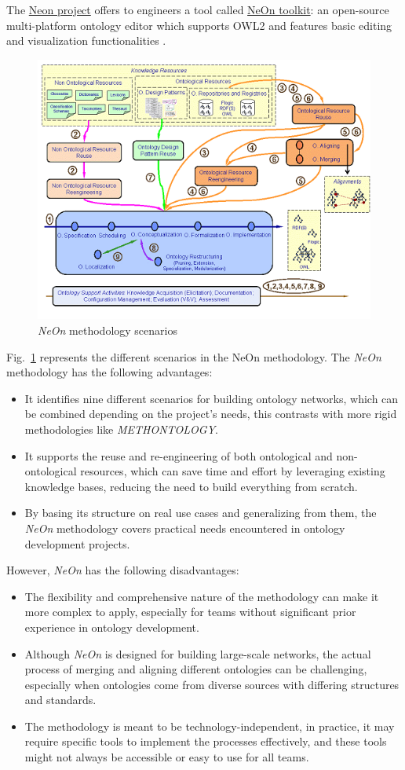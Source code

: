 The \href{http://neon-project.org/nw/Welcome_to_the_NeOn_Project.html}{Neon project} offers to engineers a tool called \href{http://neon-toolkit.org/wiki/Main_Page.html}{NeOn toolkit}: an open-source multi-platform ontology editor which supports OWL2 and features basic editing and visualization functionalities \cite{erdmann2011overview}.

\begin{figure}[H]
    \centering
    \includegraphics[width=0.5\linewidth]{Figures/fig_2.png}
    \caption{\textit{NeOn} methodology scenarios}
    \label{fig:2}
\end{figure}
Fig.~\ref{fig:2} represents the different scenarios in the NeOn methodology.
The \textit{NeOn} methodology has the following advantages:
\begin{itemize}
    \item It identifies nine different scenarios for building ontology networks, which can be combined depending on the project’s needs, this contrasts with more rigid methodologies like \textit{METHONTOLOGY}.

    \item It supports the reuse and re-engineering of both ontological and non-ontological resources, which can save time and effort by leveraging existing knowledge bases, reducing the need to build everything from scratch.

    \item By basing its structure on real use cases and generalizing from them, the \textit{NeOn} methodology covers practical needs encountered in ontology development projects.
\end{itemize}
However, \textit{NeOn} has the following disadvantages:
\begin{itemize}
    \item The flexibility and comprehensive nature of the methodology can make it more complex to apply, especially for teams without significant prior experience in ontology development. 

    \item Although \textit{NeOn} is designed for building large-scale networks, the actual process of merging and aligning different ontologies can be challenging, especially when ontologies come from diverse sources with differing structures and standards.

    \item The methodology is meant to be technology-independent, in practice, it may require specific tools to implement the processes effectively, and these tools might not always be accessible or easy to use for all teams.
\end{itemize}

